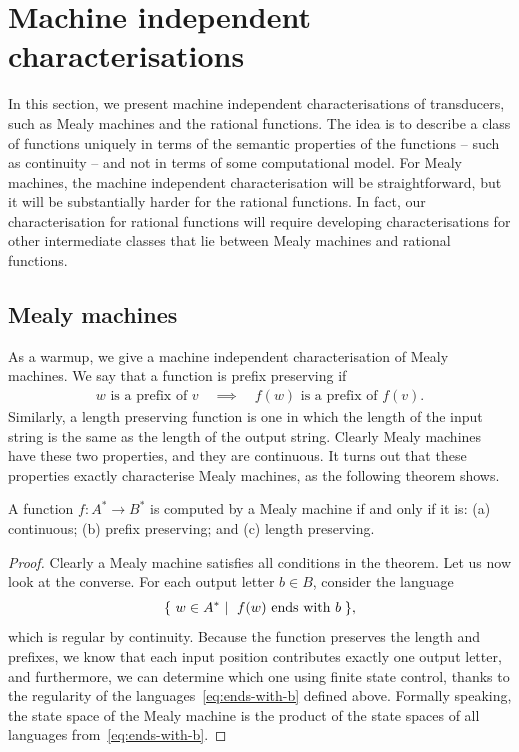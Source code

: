 \section{Machine independent characterisations}
\label{sec:rational-myhill-nerode}

\newcommand{\dist}{\mathrm{d}}

In this section, we present machine independent characterisations of transducers, such as Mealy machines and the rational functions. The idea is to describe a class of functions uniquely in terms of the semantic properties of the functions -- such as continuity -- and not in terms of some computational model. For Mealy machines, the machine independent characterisation will be straightforward, but it will be substantially harder for the rational functions. In fact, our characterisation for rational functions will require developing characterisations for other intermediate classes that lie between Mealy machines and rational functions.

\subsection{Mealy machines}
\label{sec:mealy-machines-independent}
As a warmup, we give a machine independent characterisation of Mealy machines. We say that a function is prefix preserving if
\begin{align*}
\text{$w$ is a prefix of $v$} 
\quad \implies \quad 
\text{$f(w)$ is a prefix of $f(v)$}.
\end{align*}
Similarly, a length preserving function is one in which the length of the input string is the same as the length of the output string. Clearly Mealy machines have these two properties, and they are continuous. It turns out that these properties exactly characterise Mealy machines, as the following theorem shows.


\begin{theorem}\label{thm:mealy-machine-independent}
    A function $f : A^* \to B^*$ is computed by a Mealy machine if and only if it is: (a) continuous; (b) prefix preserving; and (c) length preserving.
\end{theorem}

\begin{proof}
    Clearly a Mealy machine satisfies all conditions in the theorem. Let us now look at the converse. For each output letter $b \in B$, consider the language 
    \begin{align}\label{eq:ends-with-b}
    \setbuild{ w \in A^*}{$f(w)$ ends with $b$},
    \end{align}
    which is regular by continuity.  Because the function preserves the length and prefixes, we know that each input position contributes exactly one output letter, and furthermore, we can determine which one using finite state control, thanks to the regularity of the languages~\eqref{eq:ends-with-b} defined above. Formally speaking, the state space of the Mealy machine is the product of the state spaces of all languages from~\eqref{eq:ends-with-b}.
\end{proof}


